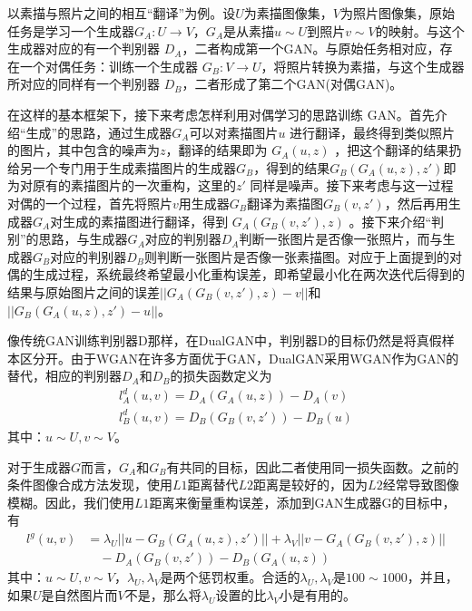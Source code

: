             以素描与照片之间的相互“翻译”为例。设$U$为素描图像集，$V$为照片图像集，原始任务是学习一个生成器$G_A:U\rightarrow V$，$G_A$是从素描$u\sim U$到照片$v\sim V$的映射。与这个生成器对应的有一个判别器 $D_A$，二者构成第一个GAN。与原始任务相对应，存在一个对偶任务：训练一个生成器 $G_B:V\rightarrow U$，将照片转换为素描，与这个生成器所对应的同样有一个判别器 $D_B$，二者形成了第二个GAN(对偶GAN)。
            \par
            在这样的基本框架下，接下来考虑怎样利用对偶学习的思路训练 GAN。首先介绍“生成”的思路，通过生成器$ G_A $可以对素描图片$ u$ 进行翻译，最终得到类似照片的图片，其中包含的噪声为$ z$，翻译的结果即为 $G_A(u,z)$ ，把这个翻译的结果扔给另一个专门用于生成素描图片的生成器$ G_B$，得到的结果$ G_B(G_A(u, z),z') $即为对原有的素描图片的一次重构，这里的$ z'$ 同样是噪声。接下来考虑与这一过程对偶的一个过程，首先将照片$ v $用生成器$ G_B$翻译为素描图$ G_B(v,z') $，然后再用生成器$ G_A $对生成的素描图进行翻译，得到 $G_A(G_B(v,z'),z)$ 。接下来介绍“判别”的思路，与生成器$ G_A $对应的判别器$ D_A $判断一张图片是否像一张照片，而与生成器$ G_B $对应的判别器$ D_B $则判断一张图片是否像一张素描图。对应于上面提到的对偶的生成过程，系统最终希望最小化重构误差，即希望最小化在两次迭代后得到的结果与原始图片之间的误差$|| G_A(G_B(v,z'),z)-v || $和$|| G_B(G_A(u,z),z')-u || $。
            \par
            像传统GAN训练判别器D那样，在DualGAN中，判别器D的目标仍然是将真假样本区分开。由于WGAN在许多方面优于GAN，DualGAN采用WGAN作为GAN的替代，相应的判别器$D_A$和$D_B$的损失函数定义为
            \begin{align*}
            l_A^d(u,v) = D_A(G_A(u,z)) - D_A(v)\\
            l_B^d(u,v) = D_B(G_B(v,z')) - D_B(u)
            \end{align*}
            其中：$u\sim U,v\sim V$。
            \par
            对于生成器$G$而言，$G_A$和$G_B$有共同的目标，因此二者使用同一损失函数。之前的条件图像合成方法发现，使用$L1$距离替代$L2$距离是较好的，因为$L2$经常导致图像模糊。因此，我们使用$L1$距离来衡量重构误差，添加到GAN生成器G的目标中，有
            \begin{align*}
            l^g(u,v) &= \lambda_U||u-G_B(G_A(u,z),z')||+\lambda_V||v-G_A(G_B(v,z'),z)||\\
            &\quad -D_A(G_B(v,z')) - D_B(G_A(u,z))
            \end{align*}
            其中：$u\sim U,v\sim V$，$\lambda_U,\lambda_V$是两个惩罚权重。合适的$\lambda_U,\lambda_V$是$100\sim 1000$，并且，如果$U$是自然图片而$V$不是，那么将$\lambda_U$设置的比$\lambda_V$小是有用的。
